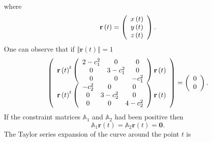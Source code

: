 \documentclass[aps,preprint]{revtex4}%
\begin{document}
where
\begin{equation}
\mathbf{r}\left(  t\right)  =\left(
\begin{array}
[c]{c}%
x\left(  t\right) \\
y\left(  t\right) \\
z\left(  t\right)
\end{array}
\right)  .
\end{equation}
One can observe that if $\left\Vert \mathbf{r}\left(  t\right)  \right\Vert
=1$
\begin{equation}
\left(
\begin{array}
[c]{c}%
\mathbf{r}\left(  t\right)  ^{t}\left(
\begin{array}
[c]{ccc}%
2-c_{1}^{2} & 0 & 0\\
0 & 3-c_{1}^{2} & 0\\
0 & 0 & -c_{1}^{2}%
\end{array}
\right)  \mathbf{r}\left(  t\right) \\
\mathbf{r}\left(  t\right)  ^{t}\left(
\begin{array}
[c]{ccc}%
-c_{2}^{2} & 0 & 0\\
0 & 3-c_{2}^{2} & 0\\
0 & 0 & 4-c_{2}^{2}%
\end{array}
\right)  \mathbf{r}\left(  t\right)
\end{array}
\right)  =\left(
\begin{array}
[c]{c}%
0\\
0
\end{array}
\right)  .
\end{equation}
If the constraint matrices $\mathbb{A}_{1}$ and $\mathbb{A}_{2}$ had been
positive then
\begin{equation}
\mathbb{A}_{1}\mathbf{r}\left(  t\right)  =\mathbb{A}_{2}\mathbf{r}\left(
t\right)  =\mathbf{0.}%
\end{equation}
The Taylor series expansion of the curve around the point $t$ is
\end{document}
